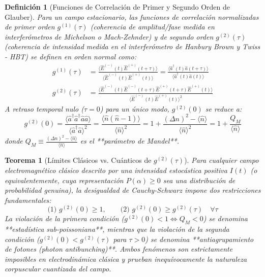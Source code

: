\documentclass[11pt,a4paper]{book}
\newtheorem{definicion}{Definición}[chapter]
\newtheorem{teorema}{Teorema}[chapter]
\begin{document}
\begin{definicion}[Funciones de Correlación de Primer y Segundo Orden de Glauber]
Para un campo estacionario, las funciones de correlación normalizadas de primer orden $g^{(1)}(\tau)$ (coherencia de amplitud/fase medida en interferómetros de Michelson o Mach-Zehnder) y de segundo orden $g^{(2)}(\tau)$ (coherencia de intensidad medida en el interferómetro de Hanbury Brown y Twiss - HBT) se definen en orden normal como:
\begin{align}
g^{(1)}(\tau) &= \frac{\langle \hat{E}^{(-)}(t) \hat{E}^{(+)}(t+\tau) \rangle}{\langle \hat{E}^{(-)}(t) \hat{E}^{(+)}(t) \rangle} = \frac{\langle \hat{a}^\dagger(t) \hat{a}(t+\tau) \rangle}{\langle \hat{a}^\dagger(t) \hat{a}(t) \rangle} \\
g^{(2)}(\tau) &= \frac{\langle \hat{E}^{(-)}(t) \hat{E}^{(-)}(t+\tau) \hat{E}^{(+)}(t+\tau) \hat{E}^{(+)}(t) \rangle}{\langle \hat{E}^{(-)}(t) \hat{E}^{(+)}(t) \rangle^2}
\end{align}
A retraso temporal nulo ($\tau = 0$) para un único modo, $g^{(2)}(0)$ se reduce a:
\begin{equation}
g^{(2)}(0) = \frac{\langle \hat{a}^\dagger \hat{a}^\dagger \hat{a} \hat{a} \rangle}{\langle \hat{a}^\dagger \hat{a} \rangle^2} = \frac{\langle \hat{n}(\hat{n} - 1) \rangle}{\langle \hat{n} \rangle^2} = 1 + \frac{(\Delta n)^2 - \langle \hat{n} \rangle}{\langle \hat{n} \rangle^2} = 1 + \frac{Q_M}{\langle \hat{n} \rangle}
\end{equation}
donde $Q_M \equiv \frac{(\Delta n)^2 - \langle \hat{n} \rangle}{\langle \hat{n} \rangle}$ es el **parámetro de Mandel**.
\end{definicion}

\begin{teorema}[Límites Clásicos vs. Cuánticos de $g^{(2)}(\tau)$]
Para cualquier campo electromagnético clásico descrito por una intensidad estocástica positiva $I(t)$ (o equivalentemente, cuya representación $P(\alpha) \geq 0$ sea una distribución de probabilidad genuina), la desigualdad de Cauchy-Schwarz impone dos restricciones fundamentales:
\begin{equation}
\text{(1) } g^{(2)}(0) \geq 1, \qquad \text{(2) } g^{(2)}(0) \geq g^{(2)}(\tau) \quad \forall \tau
\end{equation}
La violación de la primera condición ($g^{(2)}(0) < 1 \iff Q_M < 0$) se denomina **estadística sub-poissoniana**, mientras que la violación de la segunda condición ($g^{(2)}(0) < g^{(2)}(\tau)$ para $\tau > 0$) se denomina **antiagrupamiento de fotones (\textit{photon antibunching})**. Ambos fenómenos son estrictamente imposibles en electrodinámica clásica y prueban inequívocamente la naturaleza corpuscular cuantizada del campo.
\end{teorema}
\end{document}
